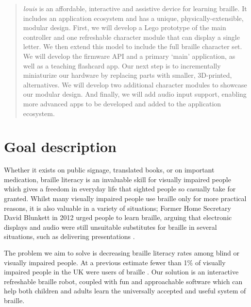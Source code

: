 \documentclass{article}
\begin{document}
 



\begin{abstract} 
\emph{louis} is an affordable, interactive and assistive device for learning braille. It includes an application ecosystem and has a unique, physically-extensible, modular design. First, we will develop a Lego prototype of the main controller and one refreshable character module that can display a single letter. We then extend this model to include the full braille character set. We will develop the firmware API and a primary `main' application, as well as a teaching flashcard app. Our next step is to incrementally miniaturize our hardware by replacing parts with smaller, 3D-printed, alternatives. We will develop two additional character modules to showcase our modular design. And finally, we will add audio input support, enabling more advanced apps to be developed and added to the application ecosystem.
\end{abstract}

\section{Goal description} 

Whether it exists on public signage, translated books, or on important medication, braille literacy is an invaluable skill for visually impaired people which gives a freedom in everyday life that sighted people so casually take for granted. Whilst many visually impaired people use braille only for more practical reasons, it is also valuable in a variety of situations; Former Home Secretary David Blunkett in 2012 urged people to learn braille, arguing that electronic displays and audio were still unsuitable substitutes for braille in several situations, such as delivering presentations \cite{braillespreading}.

The problem we aim to solve is decreasing braille literacy rates among blind or visually impaired people. At a previous estimate fewer than 1\% of visually impaired people in the UK were users of braille \cite{braillespreading}. Our solution is an interactive refreshable braille robot, coupled with fun and approachable software which can help both children and adults learn the universally accepted and useful system of braille. 
\end{document}
